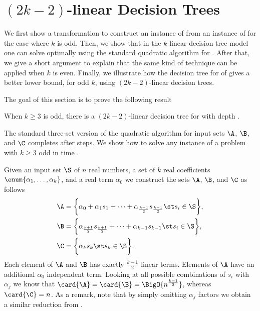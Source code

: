 \section{\((2k-2)\)-linear Decision Trees}
\label{tree:3sum:kldt}

We first show a transformation to construct an instance
of \threeSUM from an instance of \kLDT for the case where \(k\) is odd. Then, we
show that in the \(k\)-linear decision tree model one can solve \kLDT optimally
using the standard quadratic algorithm for \threeSUM. After that, we give a
short argument to explain that the same kind of technique can be applied when
\(k\) is even. Finally, we illustrate how the decision tree for \threeSUM of
\citet*{gronlund:2014} gives a better lower bound, for odd \(k\), using
\((2k-2)\)-linear decision trees.

The goal of this section is to prove the following result
\begin{theorem}
When $k \ge 3$ is odd, there is a $(2k-2)$-linear decision tree for \kLDT with
depth .
\end{theorem}

The standard three-set version of the quadratic \threeSUM algorithm for input
sets \(\A\), \(\B\), and \(\C\) completes after \BigO{\card{\C} ( \card{\A} +
\card{\B} ) } steps. We show how to solve any instance of a \kLDT problem
with \(k \ge 3\) odd in time .

Given an input set \(\S\) of \(n\) real numbers, a set of \(k\) real
coefficients \( \enum{\alpha_1,\ldots,\alpha_k}\), and a real term \(\alpha_0\)
we construct the sets \(\A\), \(\B\), and \(\C\) as follows
\begin{align*}
\A &= \bigg\{\alpha_0 + \alpha_1 s_1 + \cdots + \alpha_{\frac{k-1}{2}} s_{\frac{k-1}{2}} \st s_i \in \S\bigg\},\\
\B &= \bigg\{\alpha_{\frac{k+1}{2}} s_{\frac{k+1}{2}} + \cdots + \alpha_{k-1} s_{k-1} \st s_i \in \S\bigg\},\\
\C &= \bigg\{\alpha_k s_k \st s_k \in \S\bigg\}.
\end{align*}
Each element of \(\A\) and \(\B\) has exactly \(\frac{k-1}{2}\) linear terms.
Elements of \(\A\) have an additional \(\alpha_0\) independent term. Looking
at all possible combinations of \(s_i\) with \(\alpha_j\) we know that
\(\card{\A} = \card{\B} = \BigO{n^{\frac{k-1}{2}}}\), whereas \(\card{\C} =
n\). As a remark, note that by simply omitting \(\alpha_j\) factors we obtain a
similar reduction from \kSUM.

